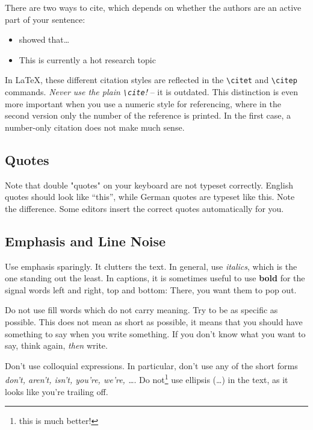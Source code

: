\documentclass[runningheads,a4paper]{llncs}
\begin{document}
There are two ways to cite, which depends on whether the authors are an
active part of your sentence:
\begin{itemize}[noitemsep]
    \item \citet{Bailey} showed that\ldots{}
    \item This is currently a hot research topic \citep{Bailey}
\end{itemize}
In  \LaTeX{}, these  different  citation styles  are  reflected in  the
\texttt{\textbackslash citet}  and  \texttt{\textbackslash citep}  commands. 
\textit{Never  use  the  plain
\texttt{\textbackslash cite}!} -- it is outdated.
This distinction  is even more important  when you use a  numeric style
for referencing, where in the second version only the number of the 
reference is printed.   In the first case, a  number-only citation does
not make much sense.

\subsection{Quotes}
Note that double "quotes" on  your keyboard are not typeset correctly. 
English  quotes should  look like  ``this'', while  German quotes  are 
typeset  like \glqq this\grqq.   Note the  difference.  Some  editors 
insert the correct quotes automatically for you.                       

\subsection{Emphasis and Line Noise}
Use  emphasis  sparingly.  It  clutters  the  text.  In  general,  use 
\emph{italics}, which is the one standing out the least.  In captions, 
it is sometimes useful to use  \textbf{bold} for the signal words left 
and right, top and bottom: There, you want them to pop out.

Do  not use  fill words  which do  not carry  meaning.  Try  to be  as 
specific as  possible.  This does  not mean  as short as  possible, it 
means that you should have something to say when you write something.
If you don't know what you want to say, think again, \emph{then} write.

Don't use colloquial expressions.  In particular, don't use any of the 
short forms  \emph{don't, aren't,  isn't, you're, we're,  \ldots}.  Do 
not\footnote{this is much better!} use  ellipsis (\ldots) in the text, 
as it looks like you're trailing off.                                  
\end{document}
